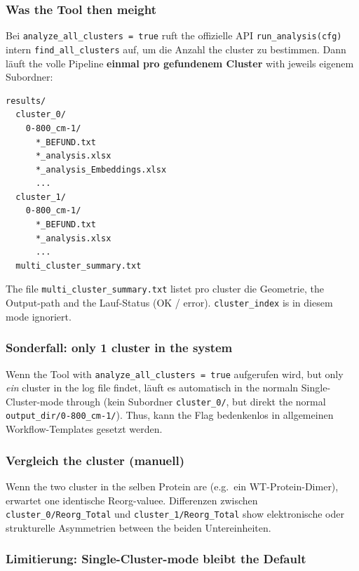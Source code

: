 \documentclass[11pt,a4paper,twoside]{article}
\theoremstyle{remark}
\begin{document}
\subsubsection*{Was the Tool then meight}

Bei \texttt{analyze\_all\_clusters = true} ruft the offizielle API
\texttt{run\_analysis(cfg)} intern \texttt{find\_all\_clusters} auf, um
die Anzahl the cluster zu bestimmen. Dann l\"auft the volle Pipeline
\textbf{einmal pro gefundenem Cluster} with jeweils eigenem Subordner:

\begin{lstlisting}[style=bash]
results/
  cluster_0/
    0-800_cm-1/
      *_BEFUND.txt
      *_analysis.xlsx
      *_analysis_Embeddings.xlsx
      ...
  cluster_1/
    0-800_cm-1/
      *_BEFUND.txt
      *_analysis.xlsx
      ...
  multi_cluster_summary.txt
\end{lstlisting}

The file \texttt{multi\_cluster\_summary.txt} listet pro cluster die
Geometrie, the Output-path and the Lauf-Status (OK / error).
\texttt{cluster\_index} is in diesem mode ignoriert.

\subsubsection*{Sonderfall: only 1 cluster in the system}

Wenn the Tool with \texttt{analyze\_all\_clusters = true} aufgerufen
wird, but only \emph{ein} cluster in the log file findet, l\"auft es
automatisch in the normaln Single-Cluster-mode through (kein Subordner
\texttt{cluster\_0/}, but direkt the normal
\texttt{output\_dir/0-800\_cm-1/}). Thus, kann the Flag bedenkenlos in
allgemeinen Workflow-Templates gesetzt werden.

\subsubsection*{Vergleich the cluster (manuell)}

Wenn the two cluster in the selben Protein are (e.g.\ ein
WT-Protein-Dimer), erwartet one identische Reorg-valuee. Differenzen
zwischen \texttt{cluster\_0/Reorg\_Total} und
\texttt{cluster\_1/Reorg\_Total} show elektronische oder
strukturelle Asymmetrien between the beiden Untereinheiten.

\subsubsection*{Limitierung: Single-Cluster-mode bleibt the Default}
\end{document}
